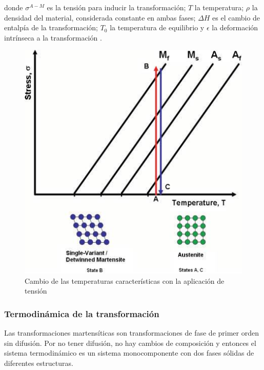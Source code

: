 \documentclass[12pt]{article}
\theoremstyle{definition}
\theoremstyle{remark}
\begin{document}
donde $\sigma^{A-M}$ es la tensión para inducir la transformación; $T$ la temperatura; $\rho$ la densidad del material, considerada constante en ambas fases; $\Delta H$ es el cambio de entalpía de la transformación; $T_0$ la temperatura de equilibrio y $\epsilon$ la deformación intrínseca a la transformación \citep{Malvasio}.

\begin{figure}[H]
	\centering
	\includegraphics[scale=0.4]{img/StressTransformation.png}
	\caption{Cambio de las temperaturas características con la aplicación de tensión}
	\label{TvsS}
\end{figure}

\subsubsection{Termodinámica de la transformación}
Las transformaciones martensíticas son transformaciones de fase de primer orden sin difusión. Por no tener difusión, no hay cambios de composición y entonces el sistema termodinámico es un sistema monocomponente con dos fases sólidas de diferentes estructuras.\cite{Santamarta}
\end{document}
